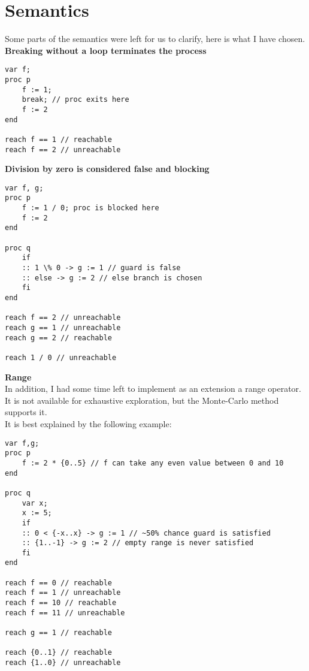\section{Semantics}

Some parts of the semantics were left for us to clarify, here is what I have chosen.\\

\textbf{Breaking without a loop terminates the process}
\begin{lstlisting}
var f;
proc p
    f := 1;
    break; // proc exits here
    f := 2
end

reach f == 1 // reachable
reach f == 2 // unreachable
\end{lstlisting}


\textbf{Division by zero is considered false and blocking}
\begin{lstlisting}
var f, g;
proc p
    f := 1 / 0; proc is blocked here
    f := 2
end

proc q
    if
    :: 1 \% 0 -> g := 1 // guard is false
    :: else -> g := 2 // else branch is chosen
    fi
end

reach f == 2 // unreachable
reach g == 1 // unreachable
reach g == 2 // reachable

reach 1 / 0 // unreachable
\end{lstlisting}

\textbf{Range}\\
In addition, I had some time left to implement as an extension
a range operator. It is not available for exhaustive exploration,
but the Monte-Carlo method supports it.\\
It is best explained by the following example:
\begin{lstlisting}
var f,g;
proc p
    f := 2 * {0..5} // f can take any even value between 0 and 10
end

proc q
    var x;
    x := 5;
    if
    :: 0 < {-x..x} -> g := 1 // ~50% chance guard is satisfied
    :: {1..-1} -> g := 2 // empty range is never satisfied
    fi
end

reach f == 0 // reachable
reach f == 1 // unreachable
reach f == 10 // reachable
reach f == 11 // unreachable

reach g == 1 // reachable

reach {0..1} // reachable
reach {1..0} // unreachable
\end{lstlisting}

